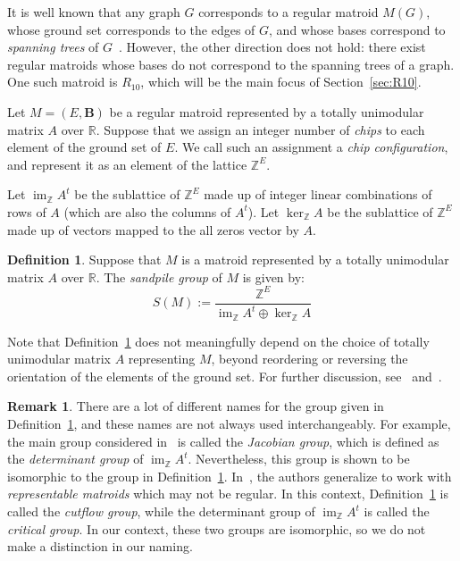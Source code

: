 \documentclass[12p]{amsart}
\numberwithin{equation}{section}
\theoremstyle{plain}
\theoremstyle{definition}
\newtheorem{defn}[thm]{Definition}
\newtheorem{remark}[thm]{Remark}
\newcommand{\Z}{\mathbb {Z}}
\newcommand{\mbf}{\mathbf}
\DeclareMathOperator{\im}{im}
\begin{document}
It is well known that any graph $G$ corresponds to a regular matroid $M(G)$, whose ground set corresponds to the edges of $G$, and whose bases correspond to \emph{spanning trees} of $G$~\cite[Section 5.1]{Oxley}. However, the other direction does not hold: there exist regular matroids whose bases do not correspond to the spanning trees of a graph. One such matroid is $R_{10}$, which will be the main focus of Section~\ref{sec:R10}. 

Let $M = (E,\mbf B)$ be a regular matroid represented by a totally unimodular matrix $A$ over $\mathbb R$. Suppose that we assign an integer number of \emph{chips} to each element of the ground set of $E$.  We call such an assignment a \emph{chip configuration}, and represent it as an element of the lattice $\Z^E$.

Let $\im_{\Z} A^t$ be the sublattice of $\Z^E$ made up of integer linear combinations of rows of $A$ (which are also the columns of $A^t$). Let $\ker_{\Z} A$ be the sublattice of $\Z^E$ made up of vectors mapped to the all zeros vector by $A$. 

\begin{defn}\label{def:sandpile}
    Suppose that $M$ is a matroid represented by a totally unimodular matrix $A$ over $\mathbb R$. The \emph{sandpile group} of $M$ is given by:
    \[S(M) := \frac{\Z^E}{\im_ {\Z} A^t\oplus \ker_ {\Z} A}\]
\end{defn}

Note that Definition~\ref{def:sandpile} does not meaningfully depend on the choice of totally unimodular matrix $A$ representing $M$, beyond reordering or reversing the orientation of the elements of the ground set. For further discussion, see~\cite[Section 2.1]{BBY} and~\cite{SuWagner}. 

\begin{remark}\label{rem:names}
    There are a lot of different names for the group given in Definition~\ref{def:sandpile}, and these names are not always used interchangeably. For example, the main group considered in~\cite{BBY} is called the \emph{Jacobian group}, which is defined as the \emph{determinant group} of $\im_ {\Z} A^t$. Nevertheless, this group is shown to be isomorphic to the group in Definition~\ref{def:sandpile}. In~\cite{CutsFlows}, the authors generalize to work with \emph{representable matroids} which may not be regular. In this context, Definition~\ref{def:sandpile} is called the \emph{cutflow group}, while the determinant group of $\im_{\Z} A^t$ is called the \emph{critical group}. In our context, these two groups are isomorphic, so we do not make a distinction in our naming. 
\end{remark}
\end{document}
